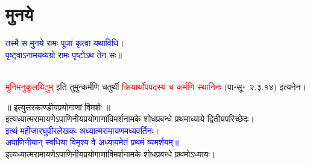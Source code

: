 \section[मुनये]{मुनये}
\centering\textcolor{blue}{तस्मै स मुनये रामः पूजां कृत्वा यथाविधि।\nopagebreak\\
पृष्ट्वाऽनामयव्यग्रो रामः पृष्टोऽथ तेन सः॥}\nopagebreak\\
\\
\begin{sloppypar}\justifying\noindent\hspace{10mm} \textcolor{red}{मुनिमनुकूलयितुम्‌} इति तुमुन्कर्मणि चतुर्थी \textcolor{red}{क्रियार्थोपपदस्य च कर्मणि स्थानिनः} (पा॰सू॰~२.३.१४) इत्यनेन।\end{sloppypar}
\vspace{2mm}
\centering ॥ इत्युत्तरकाण्डीयप्रयोगाणां विमर्शः ॥\nopagebreak\\
\vspace{4mm}
\centering इत्यध्यात्म\-रामायणेऽपाणिनीय\-प्रयोगाणां\-विमर्श\-नामके शोध\-प्रबन्धे प्रथमाध्याये द्वितीय\-परिच्छेदः।\nopagebreak\\
\vspace{4mm}
\centering\textcolor{blue}{\fontsize{16}{24}\selectfont इत्थं महीजारघुवीरलेखकः अध्यात्मरामायणमध्यवर्तिनः।\nopagebreak\\
अपाणिनीयान् स्वधिया विमृश्य वै अध्यायमेतं प्रथमं व्यमर्शयम्॥}\nopagebreak\\
\vspace{4mm}
\centering इत्यध्यात्म\-रामायणेऽपाणिनीय\-प्रयोगाणां\-विमर्श\-नामके शोध\-प्रबन्धे प्रथमोऽध्यायः।
